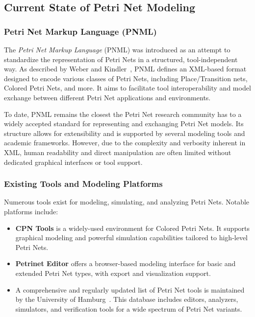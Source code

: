 \documentclass[12pt]{article}
\begin{document}
    \subsection{Current State of Petri Net Modeling}

        \subsubsection{Petri Net Markup Language (PNML)}

        The \textit{Petri Net Markup Language} (PNML) was introduced as an attempt to standardize the representation of Petri Nets in a structured, tool-independent way. As described by Weber and Kindler~\cite{weber2003petri}, PNML defines an XML-based format designed to encode various classes of Petri Nets, including Place/Transition nets, Colored Petri Nets, and more. It aims to facilitate tool interoperability and model exchange between different Petri Net applications and environments.

        To date, PNML remains the closest the Petri Net research community has to a widely accepted standard for representing and exchanging Petri Net models. Its structure allows for extensibility and is supported by several modeling tools and academic frameworks. However, due to the complexity and verbosity inherent in XML, human readability and direct manipulation are often limited without dedicated graphical interfaces or tool support.

        \subsubsection{Existing Tools and Modeling Platforms}

        Numerous tools exist for modeling, simulating, and analyzing Petri Nets. Notable platforms include:

        \begin{itemize}
            \item \textbf{CPN Tools} \cite{verbeek2021cpn} is a widely-used environment for Colored Petri Nets. It supports graphical modeling and powerful simulation capabilities tailored to high-level Petri Nets.
            \item \textbf{Petrinet Editor} \cite{app10217662} offers a browser-based modeling interface for basic and extended Petri Net types, with export and visualization support.
            \item A comprehensive and regularly updated list of Petri Net tools is maintained by the University of Hamburg~\cite{tgi_petri_tools}. This database includes editors, analyzers, simulators, and verification tools for a wide spectrum of Petri Net variants.
        \end{itemize}
\end{document}
